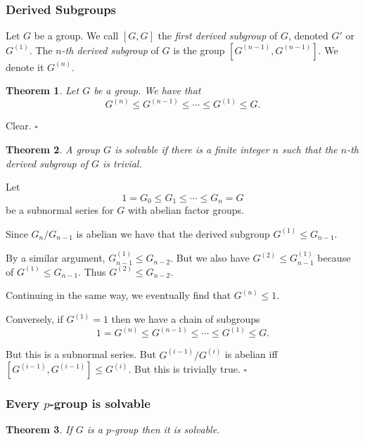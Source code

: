 \documentclass[10pt]{article}
\newtheorem{theorem}{Theorem}[section]
\newenvironment{proof}[1][Proof]{\begin{trivlist}
\item[\hskip \labelsep {\itshape #1}]}{\end{trivlist}}
\newenvironment{definition}[1][Definition]{\begin{trivlist}
\item[\hskip \labelsep {\bfseries #1}]}{\end{trivlist}}
\begin{document}
\subsubsection{Derived Subgroups}

\begin{definition}
Let $G$ be a group. We call $[G, G]$ the \emph{first derived subgroup} of $G$, denoted $G'$ or $G^{(1)}$. The \emph{$n$-th derived subgroup} of $G$ is the group $[G^{(n-1)}, G^{(n-1)}]$. We denote it $G^{(n)}$.
\end{definition}

\begin{theorem}
Let $G$ be a group. We have that
$$G^{(n)} \leq G^{(n-1)} \leq \cdots \leq G^{(1)} \leq G.$$
\end{theorem}

\begin{proof}
Clear. $\square$
\end{proof}

\begin{theorem}
A group $G$ is solvable if there is a finite integer $n$ such that the $n$-th derived subgroup of $G$ is trivial.
\end{theorem}

\begin{proof}
Let
$$1 = G_0 \leq G_1 \leq \cdots \leq G_n = G$$
be a subnormal series for $G$ with abelian factor groups.

Since $G_n/G_{n-1}$ is abelian we have that the derived subgroup $G^{(1)} \leq G_{n-1}$.

By a similar argument, $G_{n-1}^{(1)} \leq G_{n-2}$. But we also have $G^{(2)} \leq G_{n-1}^{(1)}$ because of $G^{(1)} \leq G_{n-1}$. Thus $G^{(2)} \leq G_{n-2}$.

Continuing in the same way, we eventually find that $G^{(n)} \leq 1$.

Conversely, if $G^{(1)} = 1$ then we have a chain of subgroups
$$1 = G^{(n)} \leq G^{(n-1)} \leq \cdots \leq G^{(1)} \leq G.$$

But this is a subnormal series. But $G^{(i-1)}/G^{(i)}$ is abelian iff $[G^{(i-1)}, G^{(i-1)}] \leq G^{(i)}$. But this is trivially true. $\square$ 
\end{proof}

\subsubsection{Every $p$-group is solvable}

\begin{theorem}
If $G$ is a $p$-group then it is solvable.
\end{theorem}
\end{document}
